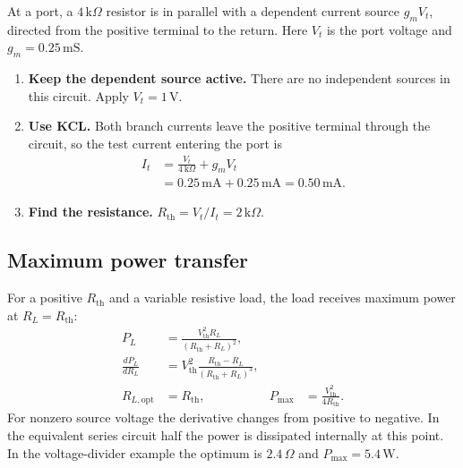\documentclass[12pt,a4paper]{article}
\begin{document}
\begin{tcolorbox}[examplebox,title={Test-source method with a dependent current source}]
At a port, a \(4\,\mathrm{k}\Omega\) resistor is in parallel with a dependent current source \(g_m V_t\), directed from the positive terminal to the return. Here \(V_t\) is the port voltage and \(g_m=0.25\,\mathrm{mS}\).
\begin{enumerate}[leftmargin=*, itemsep=3pt, topsep=4pt]
  \item \textbf{Keep the dependent source active.} There are no independent sources in this circuit. Apply \(V_t=1\,\mathrm V\).
  \item \textbf{Use KCL.} Both branch currents leave the positive terminal through the circuit, so the test current entering the port is
  \[
  \begin{aligned}
  I_t &= \frac{V_t}{4\,\mathrm{k}\Omega}+g_mV_t\\
      &= 0.25\,\mathrm{mA}+0.25\,\mathrm{mA}=0.50\,\mathrm{mA}.
  \end{aligned}
  \]
  \item \textbf{Find the resistance.} \(R_{\mathrm{th}}=V_t/I_t=2\,\mathrm{k}\Omega\).
\end{enumerate}
\end{tcolorbox}

\subsection{Maximum power transfer}
For a positive \(R_{\mathrm{th}}\) and a variable resistive load, the load receives maximum power at \(R_L=R_{\mathrm{th}}\):
\[
\begin{aligned}
P_L&=\frac{V_{\mathrm{th}}^2R_L}{(R_{\mathrm{th}}+R_L)^2},\\
\frac{dP_L}{dR_L}
 &= V_{\mathrm{th}}^2
   \frac{R_{\mathrm{th}}-R_L}{(R_{\mathrm{th}}+R_L)^3},\\
R_{L,\mathrm{opt}}&=R_{\mathrm{th}},&
P_{\max}&=\frac{V_{\mathrm{th}}^2}{4R_{\mathrm{th}}}.
\end{aligned}
\]
For nonzero source voltage the derivative changes from positive to negative. In the equivalent series circuit half the power is dissipated internally at this point. In the voltage-divider example the optimum is \(2.4\,\Omega\) and \(P_{\max}=5.4\,\mathrm W\).
\end{document}
